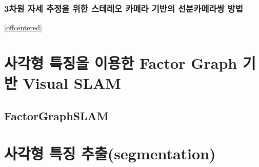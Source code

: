 \documentclass[master,korean,final]{cbnu-ecs}
\begin{document}
\subsection{3차원 자세 추정을 위한 스테레오 카메라 기반의 선분카메라쌍 방법}

\ref{offcentered}
\chapter{사각형 특징을 이용한 Factor Graph 기반 Visual SLAM}
\section{FactorGraphSLAM}
\cite{Dellaert2006}%
\cite{Kaess2007}%
\cite{Kaess2011}%

\chapter{사각형 특징 추출(segmentation)}
\cite{Zhang2003}%
\cite{Han2009}%
\cite{Wildenauer2008}%
\cite{Jung2004}%
\cite{Bazin2007}%
\cite{Bhaskar2010}%



%
%
%
\end{document}
